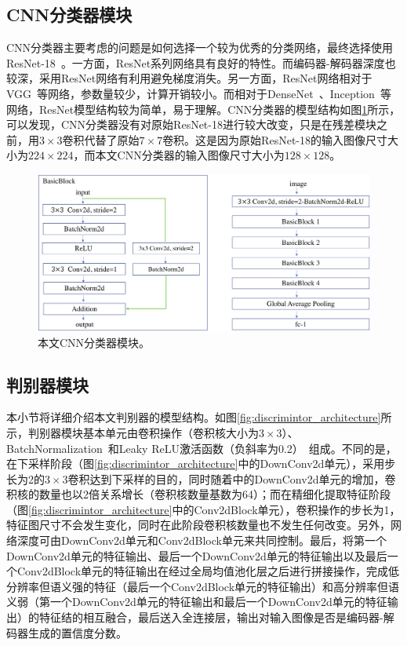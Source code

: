 \subsection{CNN分类器模块}\label{subsec:cnn_classifier_model}
CNN分类器主要考虑的问题是如何选择一个较为优秀的分类网络，最终选择使用ResNet-18~\cite{he2016deep}。一方面，ResNet系列网络具有良好的特性。而编码器-解码器深度也较深，采用ResNet网络有利用避免梯度消失。另一方面，ResNet网络相对于VGG~\cite{simonyan2014very}等网络，参数量较少，计算开销较小。而相对于DenseNet~\cite{huang2017densely}、Inception~\cite{Szegedy2015RethinkingTI}等网络，ResNet模型结构较为简单，易于理解。CNN分类器的模型结构如图\ref{fig:classifier_architecture}所示，可以发现，CNN分类器没有对原始ResNet-18进行较大改变，只是在残差模块之前，用$3\times 3$卷积代替了原始$7\times 7$卷积。这是因为原始ResNet-18的输入图像尺寸大小为$224\times 224$，而本文CNN分类器的输入图像尺寸大小为$128\times 128$。
\begin{figure}[h]
	\centering
	\includegraphics[width=1.0\textwidth]{figure/classifier_architecture.png}
	\caption[本文CNN分类器模块]{本文CNN分类器模块。}
	\label{fig:classifier_architecture}
\end{figure}
\subsection{判别器模块}\label{subsec:discrimintor_model}
本小节将详细介绍本文判别器的模型结构。如图\ref{fig:discrimintor_architecture}所示，判别器模块基本单元由卷积操作（卷积核大小为$3\times 3$）、BatchNormalization~\cite{ioffe2015batch}和Leaky ReLU激活函数（负斜率为0.2）~\cite{maas2013rectifier}组成。不同的是，在下采样阶段（图\ref{fig:discrimintor_architecture}中的DownConv2d单元），采用步长为2的$3\times 3$卷积达到下采样的目的，同时随着中的DownConv2d单元的增加，卷积核的数量也以2倍关系增长（卷积核数量基数为64）；而在精细化提取特征阶段（图\ref{fig:discrimintor_architecture}中的Conv2dBlock单元），卷积操作的步长为1，特征图尺寸不会发生变化，同时在此阶段卷积核数量也不发生任何改变。另外，网络深度可由DownConv2d单元和Conv2dBlock单元来共同控制。最后，将第一个DownConv2d单元的特征输出、最后一个DownConv2d单元的特征输出以及最后一个Conv2dBlock单元的特征输出在经过全局均值池化层之后进行拼接操作，完成低分辨率但语义强的特征（最后一个Conv2dBlock单元的特征输出）和高分辨率但语义弱（第一个DownConv2d单元的特征输出和最后一个DownConv2d单元的特征输出）的特征结的相互融合，最后送入全连接层，输出对输入图像是否是编码器-解码器生成的置信度分数。

